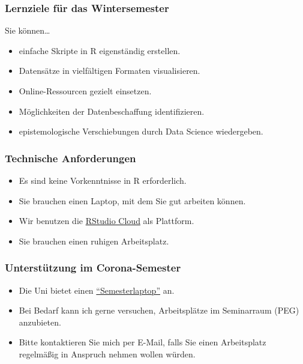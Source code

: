 \documentclass[
  ngerman,
]{article}
\providecommand{\tightlist}{%
  \setlength{\itemsep}{0pt}\setlength{\parskip}{0pt}}
\begin{document}
\hypertarget{lernziele-fuxfcr-das-wintersemester}{%
\subsubsection{Lernziele für das Wintersemester}\label{lernziele-fuxfcr-das-wintersemester}}

Sie können\ldots{}

\begin{itemize}
\tightlist
\item
  einfache Skripte in R eigenständig erstellen.
\item
  Datensätze in vielfältigen Formaten visualisieren.
\item
  Online-Ressourcen gezielt einsetzen.
\item
  Möglichkeiten der Datenbeschaffung identifizieren.
\item
  epistemologische Verschiebungen durch Data Science wiedergeben.
\end{itemize}

\hypertarget{technische-anforderungen}{%
\subsubsection{Technische Anforderungen}\label{technische-anforderungen}}

\begin{itemize}
\tightlist
\item
  Es sind keine Vorkenntnisse in R erforderlich.
\item
  Sie brauchen einen Laptop, mit dem Sie gut arbeiten können.
\item
  Wir benutzen die \href{https://rstudio.cloud}{RStudio Cloud} als Plattform.
\item
  Sie brauchen einen ruhigen Arbeitsplatz.
\end{itemize}

\hypertarget{unterstuxfctzung-im-corona-semester}{%
\subsubsection{Unterstützung im Corona-Semester}\label{unterstuxfctzung-im-corona-semester}}

\begin{itemize}
\tightlist
\item
  Die Uni bietet einen \href{https://www.starkerstart.uni-frankfurt.de/92914986/ContentPage_92914986}{``Semesterlaptop''} an.
\item
  Bei Bedarf kann ich gerne versuchen, Arbeitsplätze im Seminarraum (PEG) anzubieten.
\item
  Bitte kontaktieren Sie mich per E-Mail, falls Sie einen Arbeitsplatz regelmäßig in Anspruch nehmen wollen würden.
\end{itemize}
\end{document}
